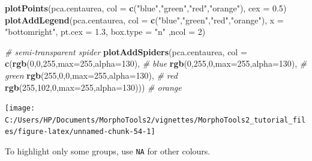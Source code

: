 \documentclass[
]{article}
\newenvironment{Shaded}{\begin{snugshade}}{\end{snugshade}}
\newcommand{\CommentTok}[1]{\textcolor[rgb]{0.56,0.35,0.01}{\textit{#1}}}
\newcommand{\DataTypeTok}[1]{\textcolor[rgb]{0.13,0.29,0.53}{#1}}
\newcommand{\DecValTok}[1]{\textcolor[rgb]{0.00,0.00,0.81}{#1}}
\newcommand{\FloatTok}[1]{\textcolor[rgb]{0.00,0.00,0.81}{#1}}
\newcommand{\KeywordTok}[1]{\textcolor[rgb]{0.13,0.29,0.53}{\textbf{#1}}}
\newcommand{\NormalTok}[1]{#1}
\newcommand{\StringTok}[1]{\textcolor[rgb]{0.31,0.60,0.02}{#1}}
\begin{document}
\begin{Shaded}
\begin{Highlighting}[]
\KeywordTok{plotPoints}\NormalTok{(pca.centaurea, }\DataTypeTok{col =} \KeywordTok{c}\NormalTok{(}\StringTok{"blue"}\NormalTok{,}\StringTok{"green"}\NormalTok{,}\StringTok{"red"}\NormalTok{,}\StringTok{"orange"}\NormalTok{), }\DataTypeTok{cex =} \FloatTok{0.5}\NormalTok{)}
\KeywordTok{plotAddLegend}\NormalTok{(pca.centaurea, }\DataTypeTok{col =} \KeywordTok{c}\NormalTok{(}\StringTok{"blue"}\NormalTok{,}\StringTok{"green"}\NormalTok{,}\StringTok{"red"}\NormalTok{,}\StringTok{"orange"}\NormalTok{), }
               \DataTypeTok{x =} \StringTok{"bottomright"}\NormalTok{, }\DataTypeTok{pt.cex =} \FloatTok{1.3}\NormalTok{, }\DataTypeTok{box.type =} \StringTok{"n"}\NormalTok{ ,}\DataTypeTok{ncol =} \DecValTok{2}\NormalTok{)}

\CommentTok{# semi-transparent spider}
\KeywordTok{plotAddSpiders}\NormalTok{(pca.centaurea, }\DataTypeTok{col =} \KeywordTok{c}\NormalTok{(}\KeywordTok{rgb}\NormalTok{(}\DecValTok{0}\NormalTok{,}\DecValTok{0}\NormalTok{,}\DecValTok{255}\NormalTok{,}\DataTypeTok{max=}\DecValTok{255}\NormalTok{,}\DataTypeTok{alpha=}\DecValTok{130}\NormalTok{), }\CommentTok{# blue}
                                      \KeywordTok{rgb}\NormalTok{(}\DecValTok{0}\NormalTok{,}\DecValTok{255}\NormalTok{,}\DecValTok{0}\NormalTok{,}\DataTypeTok{max=}\DecValTok{255}\NormalTok{,}\DataTypeTok{alpha=}\DecValTok{130}\NormalTok{), }\CommentTok{# green}
                                      \KeywordTok{rgb}\NormalTok{(}\DecValTok{255}\NormalTok{,}\DecValTok{0}\NormalTok{,}\DecValTok{0}\NormalTok{,}\DataTypeTok{max=}\DecValTok{255}\NormalTok{,}\DataTypeTok{alpha=}\DecValTok{130}\NormalTok{), }\CommentTok{# red}
                                      \KeywordTok{rgb}\NormalTok{(}\DecValTok{255}\NormalTok{,}\DecValTok{102}\NormalTok{,}\DecValTok{0}\NormalTok{,}\DataTypeTok{max=}\DecValTok{255}\NormalTok{,}\DataTypeTok{alpha=}\DecValTok{130}\NormalTok{))) }\CommentTok{# orange}
\end{Highlighting}
\end{Shaded}

\begin{center}\texttt{[image: C:/Users/HP/Documents/MorphoTools2/vignettes/MorphoTools2\_tutorial\_files/figure-latex/unnamed-chunk-54-1]} \end{center}

To highlight only some groups, use \texttt{NA} for other colours.
\end{document}
